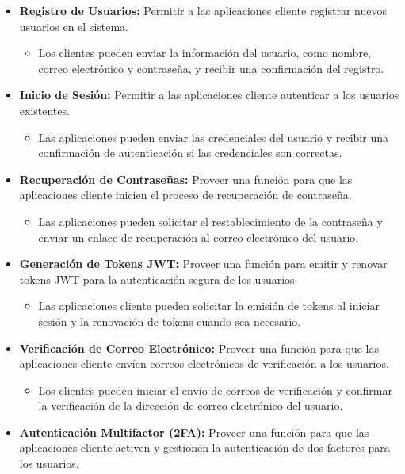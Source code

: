 \begin{itemize}
    \item \textbf{Registro de Usuarios:} Permitir a las aplicaciones cliente registrar nuevos usuarios en el sistema.
          \begin{itemize}
              \item Los clientes pueden enviar la información del usuario, como nombre, correo electrónico y contraseña, y recibir una confirmación del registro.
          \end{itemize}
    \item \textbf{Inicio de Sesión:} Permitir a las aplicaciones cliente autenticar a los usuarios existentes.
          \begin{itemize}
              \item Las aplicaciones pueden enviar las credenciales del usuario y recibir una confirmación de autenticación si las credenciales son correctas.
          \end{itemize}
    \item \textbf{Recuperación de Contraseñas:} Proveer una función para que las aplicaciones cliente inicien el proceso de recuperación de contraseña.
          \begin{itemize}
              \item Las aplicaciones pueden solicitar el restablecimiento de la contraseña y enviar un enlace de recuperación al correo electrónico del usuario.
          \end{itemize}
    \item \textbf{Generación de Tokens JWT:} Proveer una función para emitir y renovar tokens JWT para la autenticación segura de los usuarios.
          \begin{itemize}
              \item Las aplicaciones cliente pueden solicitar la emisión de tokens al iniciar sesión y la renovación de tokens cuando sea necesario.
          \end{itemize}
    \item \textbf{Verificación de Correo Electrónico:} Proveer una función para que las aplicaciones cliente envíen correos electrónicos de verificación a los usuarios.
          \begin{itemize}
              \item Los clientes pueden iniciar el envío de correos de verificación y confirmar la verificación de la dirección de correo electrónico del usuario.
          \end{itemize}
    \item \textbf{Autenticación Multifactor (2FA):} Proveer una función para que las aplicaciones cliente activen y gestionen la autenticación de dos factores para los usuarios.

\end{itemize}
